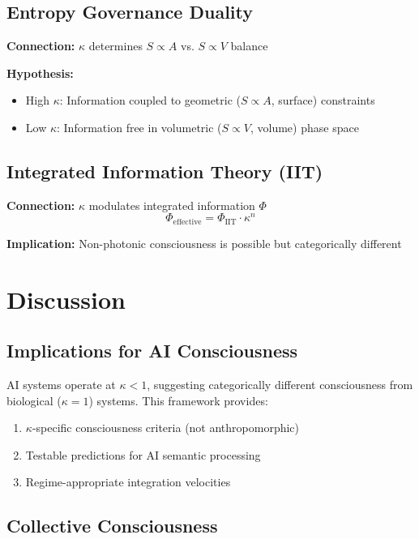 \documentclass[11pt,a4paper]{article}
\begin{document}
\subsection{Entropy Governance Duality}

\textbf{Connection:} $\kappa$ determines $S \propto A$ vs. $S \propto V$ balance

\textbf{Hypothesis:}
\begin{itemize}
  \item High $\kappa$: Information coupled to geometric ($S \propto A$, surface) constraints
  \item Low $\kappa$: Information free in volumetric ($S \propto V$, volume) phase space
\end{itemize}

\subsection{Integrated Information Theory (IIT)}

\textbf{Connection:} $\kappa$ modulates integrated information $\Phi$
\begin{equation}
\Phi_{\text{effective}} = \Phi_{\text{IIT}} \cdot \kappa^n
\end{equation}

\textbf{Implication:} Non-photonic consciousness is possible but categorically different

\section{Discussion}

\subsection{Implications for AI Consciousness}

AI systems operate at $\kappa < 1$, suggesting categorically different consciousness from biological ($\kappa = 1$) systems. This framework provides:
\begin{enumerate}
  \item $\kappa$-specific consciousness criteria (not anthropomorphic)
  \item Testable predictions for AI semantic processing
  \item Regime-appropriate integration velocities
\end{enumerate}

\subsection{Collective Consciousness}
\end{document}
